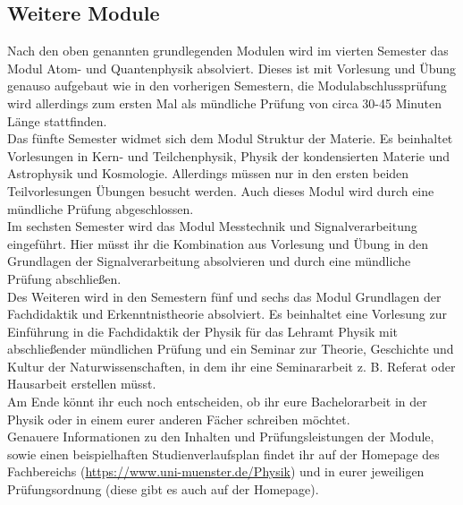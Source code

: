 \begin{multicols*}{2}
\subsection*{Weitere Module}
Nach den oben genannten grundlegenden Modulen wird im vierten Semester das Modul Atom- und Quantenphysik absolviert. Dieses ist mit Vorlesung und Übung genauso aufgebaut wie in den vorherigen Semestern, die Modulabschlussprüfung wird allerdings zum ersten Mal als mündliche Prüfung von circa 30-45 Minuten Länge stattfinden.\\
Das fünfte Semester widmet sich dem Modul Struktur der Materie. Es beinhaltet Vorlesungen in Kern- und Teilchenphysik, Physik der kondensierten Materie und Astrophysik und Kosmologie. Allerdings müssen nur in den ersten beiden Teilvorlesungen Übungen besucht werden. Auch dieses Modul wird durch eine mündliche Prüfung abgeschlossen.\\
Im sechsten Semester wird das Modul Messtechnik und Signalverarbeitung eingeführt. Hier müsst ihr die Kombination aus Vorlesung und Übung in den Grundlagen der Signalverarbeitung absolvieren und durch eine mündliche Prüfung abschließen.\\
Des Weiteren wird in den Semestern fünf und sechs das Modul Grundlagen der Fachdidaktik und Erkenntnistheorie absolviert. Es beinhaltet eine Vorlesung zur Einführung in die Fachdidaktik der Physik für das Lehramt Physik mit abschließender mündlichen Prüfung und ein Seminar zur Theorie, Geschichte und Kultur der Naturwissenschaften, in dem ihr eine Seminararbeit z. B. Referat oder Hausarbeit erstellen müsst.\\
Am Ende könnt ihr euch noch entscheiden, ob ihr eure Bachelorarbeit in der Physik oder in einem eurer anderen Fächer schreiben möchtet.\\
Genauere Informationen zu den Inhalten und Prüfungsleistungen der Module, sowie einen beispielhaften Studienverlaufsplan findet ihr auf der Homepage des Fachbereichs (\url{https://www.uni-muenster.de/Physik}) und in eurer jeweiligen Prüfungsordnung (diese gibt es auch auf der Homepage).
\end{multicols*}


